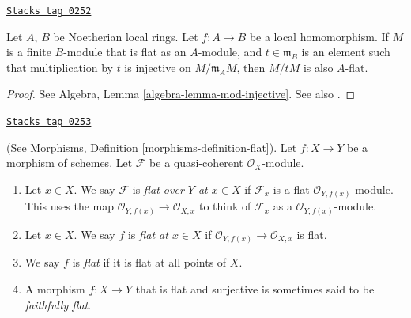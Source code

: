 \begin{theorem}
\label{etale-theorem-flatness-grothendieck}
\href{https://stacks.math.columbia.edu/tag/0252}{\texttt{Stacks tag 0252}}

Let $A$, $B$ be Noetherian local rings.
Let $f : A \to B$ be a local homomorphism.
If $M$ is a finite $B$-module that is flat as an $A$-module,
and $t \in \mathfrak m_B$ is an element such that multiplication
by $t$ is injective on $M/\mathfrak m_AM$, then $M/tM$ is also $A$-flat.
\end{theorem}

\begin{proof}
See Algebra, Lemma \ref{algebra-lemma-mod-injective}.
See also \cite[Section 20]{MatCA}.
\end{proof}

\begin{definition}
\label{etale-definition-flat-schemes}
\href{https://stacks.math.columbia.edu/tag/0253}{\texttt{Stacks tag 0253}}

(See Morphisms, Definition \ref{morphisms-definition-flat}).
Let $f : X \to Y$ be a morphism of schemes.
Let $\mathcal{F}$ be a quasi-coherent $\mathcal{O}_X$-module.
\begin{enumerate}
\item Let $x \in X$. We say $\mathcal{F}$ is
{\it flat over $Y$ at $x \in X$} if $\mathcal{F}_x$
is a flat $\mathcal{O}_{Y, f(x)}$-module.
This uses the map $\mathcal{O}_{Y, f(x)} \to \mathcal{O}_{X, x}$ to
think of $\mathcal{F}_x$ as a $\mathcal{O}_{Y, f(x)}$-module.
\item Let $x \in X$. We say $f$ is {\it flat at $x \in X$}
if $\mathcal{O}_{Y, f(x)} \to \mathcal{O}_{X, x}$ is flat.
\item We say $f$ is {\it flat} if it is flat at all points of $X$.
\item A morphism $f : X \to Y$ that is flat and surjective is sometimes
said to be {\it faithfully flat}.
\end{enumerate}
\end{definition}

